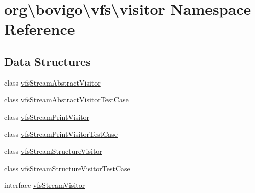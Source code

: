 \hypertarget{namespaceorg_1_1bovigo_1_1vfs_1_1visitor}{}\section{org\textbackslash{}bovigo\textbackslash{}vfs\textbackslash{}visitor Namespace Reference}
\label{namespaceorg_1_1bovigo_1_1vfs_1_1visitor}
\subsection*{Data Structures}
\begin{DoxyCompactItemize}
\item 
class \mbox{\hyperlink{classorg_1_1bovigo_1_1vfs_1_1visitor_1_1vfs_stream_abstract_visitor}{vfs\+Stream\+Abstract\+Visitor}}
\item 
class \mbox{\hyperlink{classorg_1_1bovigo_1_1vfs_1_1visitor_1_1vfs_stream_abstract_visitor_test_case}{vfs\+Stream\+Abstract\+Visitor\+Test\+Case}}
\item 
class \mbox{\hyperlink{classorg_1_1bovigo_1_1vfs_1_1visitor_1_1vfs_stream_print_visitor}{vfs\+Stream\+Print\+Visitor}}
\item 
class \mbox{\hyperlink{classorg_1_1bovigo_1_1vfs_1_1visitor_1_1vfs_stream_print_visitor_test_case}{vfs\+Stream\+Print\+Visitor\+Test\+Case}}
\item 
class \mbox{\hyperlink{classorg_1_1bovigo_1_1vfs_1_1visitor_1_1vfs_stream_structure_visitor}{vfs\+Stream\+Structure\+Visitor}}
\item 
class \mbox{\hyperlink{classorg_1_1bovigo_1_1vfs_1_1visitor_1_1vfs_stream_structure_visitor_test_case}{vfs\+Stream\+Structure\+Visitor\+Test\+Case}}
\item 
interface \mbox{\hyperlink{interfaceorg_1_1bovigo_1_1vfs_1_1visitor_1_1vfs_stream_visitor}{vfs\+Stream\+Visitor}}
\end{DoxyCompactItemize}
